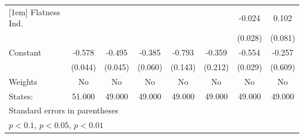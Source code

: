 {\begin{tabular}{l*{7}{c}}
[1em]
Flatness Ind.&                     &                     &                     &                     &                     &      -0.024         &       0.102         \\
            &                     &                     &                     &                     &                     &     (0.028)         &     (0.081)         \\
[1em]
Constant    &      -0.578\sym{***}&      -0.495\sym{***}&      -0.385\sym{***}&      -0.793\sym{***}&      -0.359\sym{*}  &      -0.554\sym{***}&      -0.257         \\
            &     (0.044)         &     (0.045)         &     (0.060)         &     (0.143)         &     (0.212)         &     (0.029)         &     (0.609)         \\
\hline
Weights     &          No         &          No         &          No         &          No         &          No         &          No         &          No         \\
States:     &      51.000         &      49.000         &      49.000         &      49.000         &      49.000         &      49.000         &      49.000         \\
\hline\hline
\multicolumn{8}{l}{\footnotesize Standard errors in parentheses}\\
\multicolumn{8}{l}{\footnotesize \sym{*} \(p<0.1\), \sym{**} \(p<0.05\), \sym{***} \(p<0.01\)}\\
\end{tabular}
}
